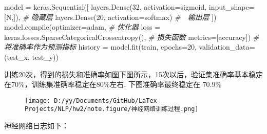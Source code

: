 \documentclass[
]{article}
\newenvironment{Shaded}{}{}
\newcommand{\BuiltInTok}[1]{#1}
\newcommand{\CommentTok}[1]{\textcolor[rgb]{0.38,0.63,0.69}{\textit{#1}}}
\newcommand{\DecValTok}[1]{\textcolor[rgb]{0.25,0.63,0.44}{#1}}
\newcommand{\NormalTok}[1]{#1}
\newcommand{\OperatorTok}[1]{\textcolor[rgb]{0.40,0.40,0.40}{#1}}
\newcommand{\StringTok}[1]{\textcolor[rgb]{0.25,0.44,0.63}{#1}}
\begin{document}
\begin{Shaded}
\begin{Highlighting}[]
\NormalTok{model }\OperatorTok{=}\NormalTok{ keras.Sequential([}
\NormalTok{    layers.Dense(}\DecValTok{32}\NormalTok{, activation}\OperatorTok{=}\StringTok{\textquotesingle{}sigmoid\textquotesingle{}}\NormalTok{, input\_shape}\OperatorTok{=}\NormalTok{[N,]),  }\CommentTok{\# 隐藏层}
\NormalTok{    layers.Dense(}\DecValTok{20}\NormalTok{, activation}\OperatorTok{=}\StringTok{\textquotesingle{}softmax\textquotesingle{}}\NormalTok{)  }\CommentTok{\#　输出层}
\NormalTok{])}
\NormalTok{model.}\BuiltInTok{compile}\NormalTok{(optimizer}\OperatorTok{=}\StringTok{\textquotesingle{}adam\textquotesingle{}}\NormalTok{,  }\CommentTok{\# 优化器}
\NormalTok{             loss }\OperatorTok{=}\NormalTok{ keras.losses.SparseCategoricalCrossentropy(),  }\CommentTok{\# 损失函数}
\NormalTok{             metrics}\OperatorTok{=}\NormalTok{[}\StringTok{\textquotesingle{}accuracy\textquotesingle{}}\NormalTok{])  }\CommentTok{\# 将准确率作为预测指标}
\NormalTok{history }\OperatorTok{=}\NormalTok{ model.fit(train, epochs}\OperatorTok{=}\DecValTok{20}\NormalTok{, validation\_data}\OperatorTok{=}\NormalTok{(test\_x, test\_y))}
\end{Highlighting}
\end{Shaded}

训练20次，得到的损失和准确率如图下图所示，15次以后，验证集准确率基本稳定在70\%，训练集准确率稳定在80\%左右.
下图准确率最终稳定在 70.9\%

\begin{figure}
\centering
\texttt{[image: D:/yy/Documents/GitHub/LaTex-Projects/NLP/hw2/note.figure/神经网络训练过程.png]}
\caption{}
\end{figure}

神经网络日志如下：
\end{document}
